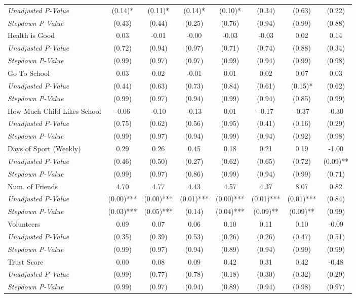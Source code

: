 \begin{tabular}{l c c c c c c c}
\quad \textit{Unadjusted P-Value} & (0.14)* & (0.11)* & (0.14)* & (0.10)* & (0.34) & (0.63) & (0.22) \\
\quad \textit{Stepdown P-Value} & (0.43) & (0.44) & (0.25) & (0.76) & (0.94) & (0.99) & (0.88) \\
Health is Good & 0.03 & -0.01 & -0.00 & -0.03 & -0.03 & 0.02 & 0.14 \\
\quad \textit{Unadjusted P-Value} & (0.72) & (0.94) & (0.97) & (0.71) & (0.74) & (0.88) & (0.34) \\
\quad \textit{Stepdown P-Value} & (0.99) & (0.97) & (0.97) & (0.99) & (0.94) & (0.99) & (0.98) \\
Go To School & 0.03 & 0.02 & -0.01 & 0.01 & 0.02 & 0.07 & 0.03 \\
\quad \textit{Unadjusted P-Value} & (0.44) & (0.63) & (0.73) & (0.84) & (0.61) & (0.15)* & (0.62) \\
\quad \textit{Stepdown P-Value} & (0.99) & (0.97) & (0.94) & (0.99) & (0.94) & (0.85) & (0.99) \\
How Much Child Likes School & -0.06 & -0.10 & -0.13 & 0.01 & -0.17 & -0.37 & -0.30 \\
\quad \textit{Unadjusted P-Value} & (0.75) & (0.62) & (0.56) & (0.95) & (0.41) & (0.16) & (0.29) \\
\quad \textit{Stepdown P-Value} & (0.99) & (0.97) & (0.94) & (0.99) & (0.94) & (0.92) & (0.98) \\
Days of Sport (Weekly) & 0.29 & 0.26 & 0.45 & 0.18 & 0.21 & 0.19 & -1.00 \\
\quad \textit{Unadjusted P-Value} & (0.46) & (0.50) & (0.27) & (0.62) & (0.65) & (0.72) & (0.09)** \\
\quad \textit{Stepdown P-Value} & (0.99) & (0.97) & (0.86) & (0.99) & (0.94) & (0.99) & (0.71) \\
Num. of Friends & 4.70 & 4.77 & 4.43 & 4.57 & 4.37 & 8.07 & 0.82 \\
\quad \textit{Unadjusted P-Value} & (0.00)*** & (0.00)*** & (0.01)*** & (0.00)*** & (0.01)*** & (0.01)*** & (0.84) \\
\quad \textit{Stepdown P-Value} & (0.03)*** & (0.05)*** & (0.14) & (0.04)*** & (0.09)** & (0.09)** & (0.99) \\
Volunteers & 0.09 & 0.07 & 0.06 & 0.10 & 0.11 & 0.10 & -0.09 \\
\quad \textit{Unadjusted P-Value} & (0.35) & (0.39) & (0.53) & (0.26) & (0.26) & (0.47) & (0.51) \\
\quad \textit{Stepdown P-Value} & (0.99) & (0.97) & (0.94) & (0.89) & (0.94) & (0.99) & (0.99) \\
Trust Score & 0.00 & 0.08 & 0.09 & 0.42 & 0.31 & 0.42 & -0.48 \\
\quad \textit{Unadjusted P-Value} & (0.99) & (0.77) & (0.78) & (0.18) & (0.30) & (0.32) & (0.29) \\
\quad \textit{Stepdown P-Value} & (0.99) & (0.97) & (0.94) & (0.89) & (0.94) & (0.98) & (0.97) \\
\bottomrule
\end{tabular}
